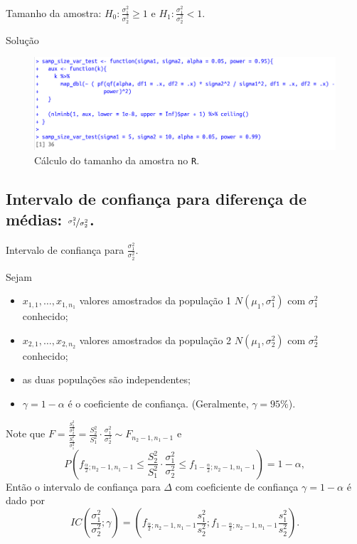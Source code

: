 \documentclass[9pt]{beamer}
\begin{document}
\begin{frame}{Tamanho da amostra: $H_0:\frac{\sigma_1^2}{\sigma_2^2} \geq 1$ e $H_1:\frac{\sigma_1^2}{\sigma_2^2} < 1$.}

\normalsize

\begin{block}{Solução}
	\begin{figure}[htbp]
		\centering
		\includegraphics[width=\linewidth]{figures/samp-size-test-var-h1-lower}
		\caption{Cálculo do tamanho da amostra no \texttt{R}.}
	\end{figure}
	
\end{block}
\end{frame}

\subsection{Intervalo de confiança para diferença de médias: $\nicefrac{\sigma_1^2}{\sigma_2^2}$.}

\begin{frame}{Intervalo de confiança para $\frac{\sigma_1^2}{\sigma_2^2}$.}

\small

Sejam
\begin{itemize}
	\item $x_{1,1}, \dots, x_{1,n_1}$ valores amostrados da população 1 $N(\mu_1, \sigma_1^2)$ com $\sigma_1^2$ conhecido;
	\item $x_{2,1}, \dots, x_{2,n_2}$ valores amostrados da população 2 $N(\mu_1, \sigma_2^2)$ com $\sigma_2^2$ conhecido;
	\item as duas populações são independentes;
	\item $\gamma=1-\alpha$ é o coeficiente de confiança. (Geralmente, $\gamma=95\%$).
\end{itemize}

Note que $F = \frac{\frac{S_2^2}{\sigma_2^2}}{\frac{S_1^2}{\sigma_1^2}} = \frac{S_2^2}{S_1^2} \cdot  \frac{\sigma_1^2}{\sigma_2^2} \sim F_{n_2-1, n_1-1}$ e 
$$P\left( f_{\frac{\alpha}{2}; n_2-1, n_1-1} \leq \frac{S_2^2}{S_1^2} \cdot  \frac{\sigma_1^2}{\sigma_2^2} \leq f_{1-\frac{\alpha}{2}; n_2-1, n_1-1} \right) = 1 - \alpha,$$
Então o intervalo de confiança para $\Delta$ com coeficiente de confiança $\gamma=1-\alpha$ é dado por
$$IC\left(\frac{\sigma_1^2}{\sigma_2^2}; \gamma\right) = \left( f_{\frac{\alpha}{2}; n_2-1, n_1-1} \frac{s_1^2}{s_2^2}; f_{1-\frac{\alpha}{2}; n_2-1, n_1-1} \frac{s_1^2}{s_2^2} \right).$$

\normalsize
\end{frame}
\end{document}
